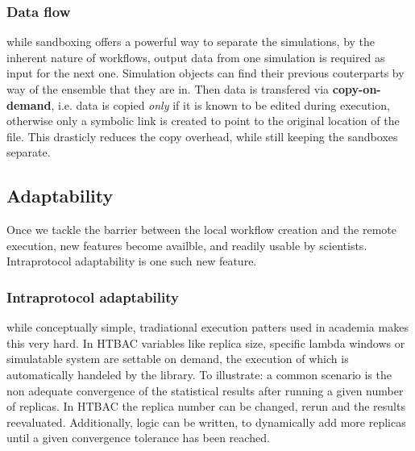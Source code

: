 \subsubsection{Data flow}

while sandboxing offers a powerful way to separate the simulations, by the
inherent nature of workflows, output data from one simulation is required as
input for the next one. Simulation objects can find their previous
couterparts by way of the ensemble that they are in. Then data is transfered
via \textbf{copy-on-demand}, i.e. data is copied \emph{only} if it is known
to be edited during execution, otherwise only a symbolic link is created to
point to the original location of the file. This drasticly reduces the copy
overhead, while still keeping the sandboxes separate.

\subsection{Adaptability}

Once we tackle the barrier between the local workflow creation and the remote
execution, new features become availble, and readily usable by scientists.
Intraprotocol adaptability is one such new feature.

\subsubsection{Intraprotocol adaptability}

while conceptually simple, tradiational execution patters used in academia
makes this very hard. In HTBAC variables like replica size, specific lambda
windows or simulatable system are settable on demand, the execution of which
is automatically handeled by the library. To illustrate: a common scenario is
the non adequate convergence of the statistical results after running a given
number of replicas. In HTBAC the replica number can be changed, rerun and the
results reevaluated. Additionally, logic can be written, to dynamically add
more replicas until a given convergence tolerance has been reached.
